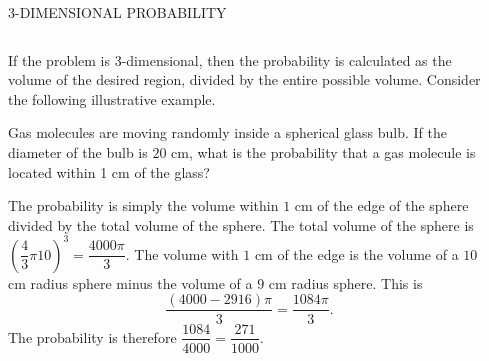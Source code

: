 \documentclass[9pt,aspectratio=169]{beamer}
\begin{document}
\begin{frame}{3-DIMENSIONAL PROBABILITY}
  \begin{columns}[T]
    \begin{column}{0.5\textwidth}
      If the problem is 3-dimensional, then the probability is calculated as the volume of the desired region, divided by the entire possible volume.  Consider the following illustrative example.
      \begin{problem}
        Gas molecules are moving randomly inside a spherical glass bulb.  If the diameter of the bulb is $20$ cm, what is the probability that a gas molecule is located within 1 cm of the glass? 
      \end{problem}
      The probability is simply the volume within $1$ cm of the edge of the sphere divided by the total volume of the sphere.  The total volume of the sphere is $(\dfrac{4}{3}\pi10)^3 = \dfrac{4000\pi}{3}$.  The volume with $1$ cm of the edge is the volume of a $10$ cm radius sphere minus the volume of a $9$ cm radius sphere. This is 
      \[\frac{(4000 - 2916)\pi}{3} = \frac{1084\pi}{3}.\]  The probability is therefore $\dfrac{1084}{4000} = \dfrac{271}{1000}$.

    \end{column}
    \begin{column}{0.5\textwidth}
    \end{column}
  \end{columns}
\end{frame}
\end{document}
